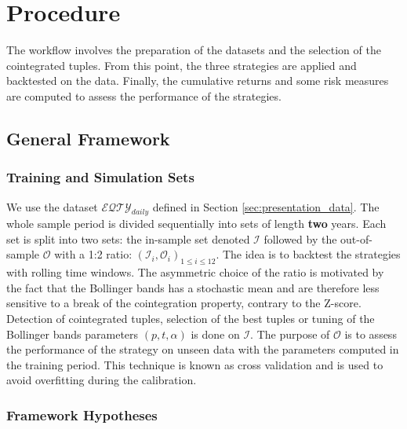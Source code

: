 \documentclass[11pt,a4,twosided,singlespacing,titlepagenumber=on]{scrreprt}
\numberwithin{equation}{chapter} %
\theoremstyle{remark}
\begin{document}
\chapter{Procedure}
The workflow involves the preparation of the datasets and the selection of the cointegrated tuples. From this point, the three strategies are applied and backtested on the data. Finally, the cumulative returns and some risk measures are computed to assess the performance of the strategies.

\section{General Framework}

\subsection{Training and Simulation Sets}
We use the dataset $\mathcal{EQTY}_{daily}$ defined in Section \ref{sec:presentation_data}. The whole sample period is divided sequentially into sets of length \textbf{two} years. Each set is split into two sets: the in-sample set denoted $\mathcal{I}$ followed by the out-of-sample $\mathcal{O}$ with a 1:2 ratio: $(\mathcal{I}_i, \mathcal{O}_i)_{1 \leq i \leq 12}$. The idea is to backtest the strategies with rolling time windows. The asymmetric choice of the ratio is motivated by the fact that the Bollinger bands has a stochastic mean and are therefore less sensitive to a break of the cointegration property, contrary to the Z-score. Detection of cointegrated tuples, selection of the best tuples or tuning of the Bollinger bands parameters $(p,t,\alpha)$ is done on $\mathcal{I}$. The purpose of $\mathcal{O}$ is to assess the performance of the strategy on unseen data with the parameters computed in the training period. This technique is known as cross validation and is used to avoid overfitting during the calibration. 


\subsection{Framework Hypotheses}
\end{document}

